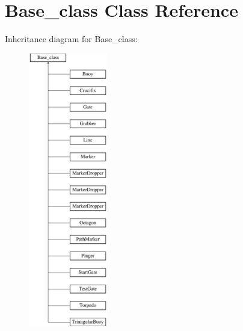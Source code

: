 \hypertarget{classBase__class}{}\section{Base\+\_\+class Class Reference}
\label{classBase__class}
Inheritance diagram for Base\+\_\+class\+:\begin{figure}[H]
\begin{center}
\leavevmode
\includegraphics[height=12.000000cm]{classBase__class}
\end{center}
\end{figure}

